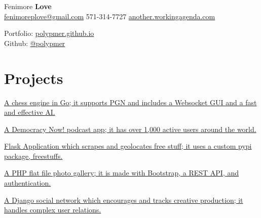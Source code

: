 \documentclass[]{deedy-resume-openfont}
\begin{document}
%
%

%
%
\begin{minipage}[t]{.6\textwidth}
{\Huge Fenimore {\textbf{Love}}}\\
\href{mailto:fenimoreplove@gmail.com}{fenimoreplove@gmail.com} \textbullet{} 571-314-7727 \textbullet{} \href{http://another.workingagenda.com}{another.workingagenda.com}\\
\end{minipage}
\hfill
\begin{minipage}[t]{.3\textwidth}
Portfolio: \href{https://polypmer.github.io}{polypmer.github.io}\\
Github: \href{https://github.com/polypmer}{@polypmer}
\end{minipage}
\namesection{}{} %

\section{Projects}
\href{https://ghess-chess.herokuapp.com/}{A chess engine in Go; it supports PGN and includes a Websocket GUI and a fast and effective AI.}
\sectionsep

\href{https://play.google.com/store/apps/details?id=com.workingagenda.democracydroid}{A Democracy Now! podcast app; it has over 1,000 active users around the world.}
\sectionsep

\href{http://treasure.plyp.org}{ Flask Application which scrapes and geolocates free stuff; it uses a custom pypi package, freestuffs.}
\sectionsep

\href{http://wink.plyp.org}{A PHP flat file photo gallery; it is made with Bootstrap, a REST API, and authentication.}
\sectionsep

\href{http://realmess.plyp.org/}{A Django social network which encourages and tracks creative production; it handles complex user relations.}
\sectionsep
\end{document}
